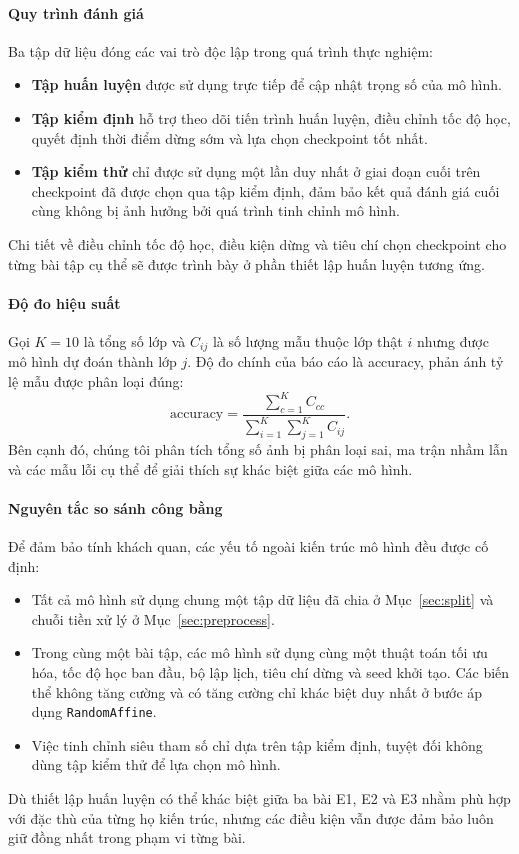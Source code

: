 \documentclass[a4paper,12pt]{article}
\begin{document}
\paragraph{Quy trình đánh giá} Ba tập dữ liệu đóng các vai trò độc lập trong quá trình thực nghiệm:
\begin{itemize}
    \item \textbf{Tập huấn luyện} được sử dụng trực tiếp để cập nhật trọng số của mô hình.
    \item \textbf{Tập kiểm định} hỗ trợ theo dõi tiến trình huấn luyện, điều chỉnh tốc độ học, quyết định thời điểm dừng sớm và lựa chọn checkpoint tốt nhất.
    \item \textbf{Tập kiểm thử} chỉ được sử dụng một lần duy nhất ở giai đoạn cuối trên checkpoint đã được chọn qua tập kiểm định, đảm bảo kết quả đánh giá cuối cùng không bị ảnh hưởng bởi quá trình tinh chỉnh mô hình.
\end{itemize}
Chi tiết về điều chỉnh tốc độ học, điều kiện dừng và tiêu chí chọn checkpoint cho từng bài tập cụ thể sẽ được trình bày ở phần thiết lập huấn luyện tương ứng.

\paragraph{Độ đo hiệu suất} Gọi $K=10$ là tổng số lớp và $C_{ij}$ là số lượng mẫu thuộc lớp thật $i$ nhưng được mô hình dự đoán thành lớp $j$. Độ đo chính của báo cáo là accuracy, phản ánh tỷ lệ mẫu được phân loại đúng:
\begin{equation}
    \mathrm{accuracy} = \frac{\sum_{c=1}^{K} C_{cc}}{\sum_{i=1}^{K}\sum_{j=1}^{K} C_{ij}}.
\end{equation}
Bên cạnh đó, chúng tôi phân tích tổng số ảnh bị phân loại sai, ma trận nhầm lẫn và các mẫu lỗi cụ thể để giải thích sự khác biệt giữa các mô hình.

\paragraph{Nguyên tắc so sánh công bằng} Để đảm bảo tính khách quan, các yếu tố ngoài kiến trúc mô hình đều được cố định:
\begin{itemize}
    \item Tất cả mô hình sử dụng chung một tập dữ liệu đã chia ở Mục~\ref{sec:split} và chuỗi tiền xử lý ở Mục~\ref{sec:preprocess}.
    \item Trong cùng một bài tập, các mô hình sử dụng cùng một thuật toán tối ưu hóa, tốc độ học ban đầu, bộ lập lịch, tiêu chí dừng và seed khởi tạo. Các biến thể không tăng cường và có tăng cường chỉ khác biệt duy nhất ở bước áp dụng \texttt{RandomAffine}.
    \item Việc tinh chỉnh siêu tham số chỉ dựa trên tập kiểm định, tuyệt đối không dùng tập kiểm thử để lựa chọn mô hình.
\end{itemize}
Dù thiết lập huấn luyện có thể khác biệt giữa ba bài E1, E2 và E3 nhằm phù hợp với đặc thù của từng họ kiến trúc, nhưng các điều kiện vẫn được đảm bảo luôn giữ đồng nhất trong phạm vi từng bài.
\end{document}
